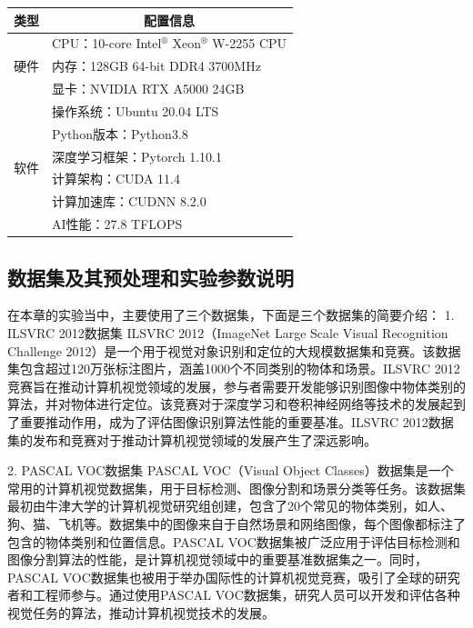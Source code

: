 \begin{table}
	\renewcommand{\arraystretch}{1.5}
\centering
{}

	\begin{tabular}{p{4cm}p{8cm}} 
\hline
类型                  & \multicolumn{1}{c}{配置信息}      \\ 
\hline
\multirow{3}{*}{硬件} & CPU：10-core Intel$^\circledR$ Xeon$^\circledR$ W-2255 CPU                  \\
& 内存：128GB 64-bit DDR4 3700MHz  \\
& 显卡：NVIDIA RTX A5000 24GB      \\ 
\hline
\multirow{6}{*}{软件} & 操作系统：Ubuntu 20.04 LTS         \\
& Python版本：Python3.8            \\
& 深度学习框架：Pytorch 1.10.1         \\
& 计算架构：CUDA 11.4                \\
& 计算加速库：CUDNN 8.2.0             \\
& AI性能：27.8 TFLOPS              \\
\hline
\end{tabular}
\end{table}


\subsection{数据集及其预处理和实验参数说明}
在本章的实验当中，主要使用了三个数据集，下面是三个数据集的简要介绍：
1. ILSVRC 2012数据集
ILSVRC 2012（ImageNet Large Scale Visual Recognition Challenge 2012）是一个用于视觉对象识别和定位的大规模数据集和竞赛。该数据集包含超过120万张标注图片，涵盖1000个不同类别的物体和场景。ILSVRC 2012竞赛旨在推动计算机视觉领域的发展，参与者需要开发能够识别图像中物体类别的算法，并对物体进行定位。该竞赛对于深度学习和卷积神经网络等技术的发展起到了重要推动作用，成为了评估图像识别算法性能的重要基准。ILSVRC 2012数据集的发布和竞赛对于推动计算机视觉领域的发展产生了深远影响。

2. PASCAL VOC数据集
PASCAL VOC（Visual Object Classes）数据集是一个常用的计算机视觉数据集，用于目标检测、图像分割和场景分类等任务。该数据集最初由牛津大学的计算机视觉研究组创建，包含了20个常见的物体类别，如人、狗、猫、飞机等。数据集中的图像来自于自然场景和网络图像，每个图像都标注了包含的物体类别和位置信息。PASCAL VOC数据集被广泛应用于评估目标检测和图像分割算法的性能，是计算机视觉领域中的重要基准数据集之一。同时，PASCAL VOC数据集也被用于举办国际性的计算机视觉竞赛，吸引了全球的研究者和工程师参与。通过使用PASCAL VOC数据集，研究人员可以开发和评估各种视觉任务的算法，推动计算机视觉技术的发展。

